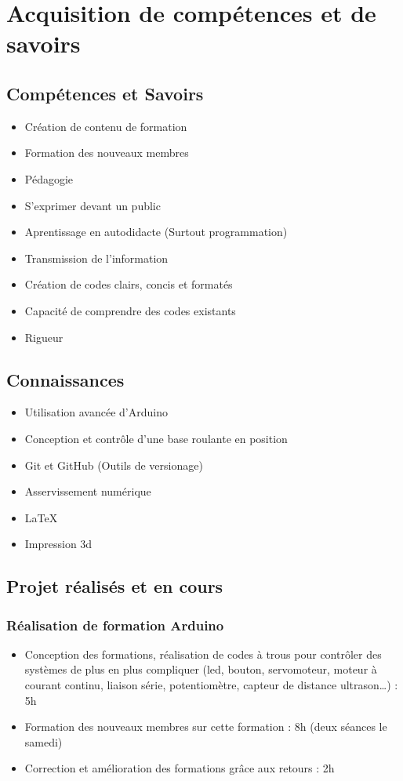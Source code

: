 \documentclass[12pt,a4paper]{article}
\begin{document}
\section*{Acquisition de compétences et de savoirs}
\subsection*{Compétences et Savoirs}
\begin{itemize}
	\item Création de contenu de formation
	\item Formation des nouveaux membres
	\item Pédagogie
	\item S'exprimer devant un public
	\item Aprentissage en autodidacte (Surtout programmation)
	\item Transmission de l'information
	\item Création de codes clairs, concis et formatés
	\item Capacité de comprendre des codes existants
	\item Rigueur
\end{itemize}
\subsection*{Connaissances}
\begin{itemize}
	\item Utilisation avancée d'Arduino
	\item Conception et contrôle d'une base roulante en position
	\item Git et GitHub (Outils de versionage)
	\item Asservissement numérique
	\item \LaTeX
	\item Impression 3d
\end{itemize}
\subsection*{Projet réalisés et en cours}
\subsubsection*{Réalisation de formation Arduino}
\begin{itemize}
	\item Conception des formations, réalisation de codes à trous pour contrôler des systèmes de plus en plus compliquer (led, bouton, servomoteur, moteur à courant continu, liaison série, potentiomètre, capteur de distance ultrason…) : 5h
	\item Formation des nouveaux membres sur cette formation : 8h (deux séances le samedi)
	\item Correction et amélioration des formations grâce aux retours : 2h
\end{itemize}
\end{document}
